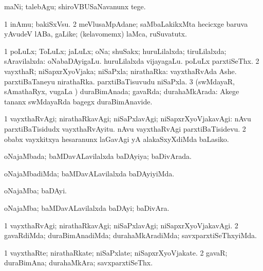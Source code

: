 \noindent 
\gl{\akirx}
\expl{}
\bmng
 maNi; talebAgu; shiroVBUSaNavanunx tege. 
\emng
\eentry

\bentry
{} 
\gl{\nA}
\bmng
\bnum
\num{1} inAmu; bakiSxVsu. 
\num{2} meVlusaMpAdane; saMbaLakikxMta hecicxge baruva yAvudeV lABa, gaLike; (kelavomemx) laMca, ruSuvatutx. 
\enum
\emng
\eentry

\bentry
{} 
\gl{\gu}
\expl{}
\bmng
\bnum
\num{1} poLuLx; ToLuLx; jaLuLx; oNa; shuSakx; huruLilalxda; tiruLilalxda; sAravilalxda:  oNabaDAyigaLu.  huruLilalxda vijayagaLu.  poLuLx parxtiSeThx. 
\num{2} vayxthaR; niSapxrXyoVjaka; niSaPxla; nirathaRka:  vayxthaRvAda Ashe.  parxtiBaTaneyu nirathaRka.  parxtiBaTisuvudu niSaPxla. 
\num{3} (swMdayaR, sAmathaRyx, \mo vugaLa \vi) duraBimAnada; gavaRda; durahaMkArada:  Akege tananx swMdayaRda bagegx duraBimAnavide. 
\enum
\emng

\noindent 
\gl{\pagu}
\expl{}
\bmng
\bnum
\num{1}  vayxthaRvAgi; nirathaRkavAgi; niSaPxlavAgi; niSapxrXyoVjakavAgi:  nAvu parxtiBaTisidudx vayxthaRvAyitu. nAvu vayxthaRvAgi parxtiBaTisidevu. 
\num{2}  obabx vayxkitxya hesaranunx laGavAgi yA alakaSxyXdiMda baLasiko. 
\enum
\emng
\eentry

\bentry
{} 
\gl{\gu}
\expl{}
\bmng
 oNajaMbada; baMDavALavilalxda baDAyiya; baDivArada. 
\emng
\eentry

\bentry
{} 
\gl{\kirxvi}
\expl{}
\bmng
 oNajaMbadiMda; baMDavALavilalxda baDAyiyiMda. 
\emng
\eentry

\bentry
{} 
\gl{\nA}
\expl{}
\bmng
 oNajaMba; baDAyi. 
\emng
\eentry

\bentry
{} 
\gl{\nA}
\expl{}
\bmng
 oNajaMba; baMDavALavilalxda baDAyi; baDivAra. 
\emng
\eentry

\bentry
{} 
\gl{\kirxvi}
\expl{}
\bmng
\bnum
\num{1} vayxthaRvAgi; nirathaRkavAgi; niSaPxlavAgi; niSapxrXyoVjakavAgi. 
\num{2} gavaRdiMda; duraBimAnadiMda; durahaMkAradiMda; savxparxtiSeThxyiMda. 
\enum
\emng
\eentry

\bentry
{} 
\gl{\nA}
\expl{}
\bmng
\bnum
\num{1} vayxthaRte; nirathaRkate; niSaPxlate; niSapxrXyoVjakate. 
\num{2} gavaR; duraBimAna; durahaMkAra; savxparxtiSeThx. 
\enum
\emng
\eentry

